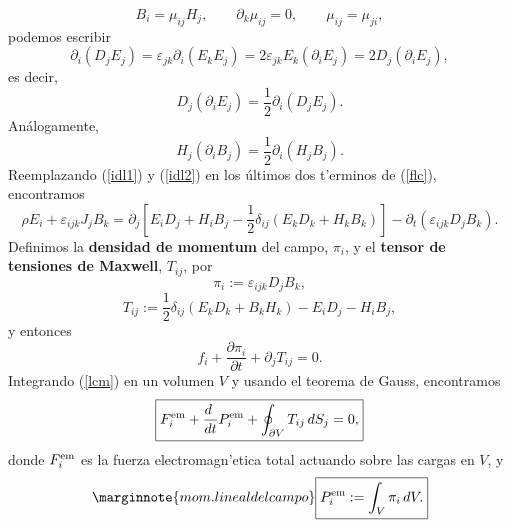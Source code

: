 \begin{equation}
 B_i=\mu_{ij}H_j, \qquad \partial_k\mu_{ij}=0,\qquad \mu_{ij}=\mu_{ji},
\end{equation}
podemos escribir
\begin{equation}
 \partial_i(D_jE_j)=\varepsilon_{jk}\partial_i(E_kE_j)=2\varepsilon_{jk}
E_k(\partial_i E_j)=2D_j(\partial_i E_j),
\end{equation}
es decir,
\begin{equation}
 D_j(\partial_i E_j)=\frac{1}{2}\partial_i(D_jE_j). \label{idl1}
\end{equation}
Análogamente,
\begin{equation}
 H_j(\partial_i B_j)=\frac{1}{2}\partial_i(H_jB_j). \label{idl2}
\end{equation}
Reemplazando (\ref{idl1}) y (\ref{idl2}) en los últimos dos t'erminos de
(\ref{flc}), encontramos
\begin{equation}
 \rho E_i+\varepsilon_{ijk}J_jB_k
=\partial_j\left[E_iD_j+H_iB_j-\frac{1}{2}\delta_{ij}\left(
E_kD_k+H_kB_k\right)\right]-\partial_t(\varepsilon_{ijk}D_jB_k).
\end{equation}
Definimos la \textbf{densidad de momentum} del campo, $\pi_i$, y el \textbf{tensor de tensiones de Maxwell}, $T_{ij}$, por
\begin{equation}
\boxed{\pi_i:=\varepsilon_{ijk}D_jB_k,}
\end{equation}
\begin{equation}
 \boxed{T_{ij}:=\frac{1}{2}\delta_{ij}\left(E_kD_k+B_kH_k\right)-E_iD_j-H_iB_j,}
\end{equation}
y entonces
\begin{equation}
\boxed{f_i+\frac{\partial\pi_i }{\partial t}+\partial_jT_{ij}=0.} \label{lcm}
\end{equation}
Integrando (\ref{lcm}) en un volumen $V$ y usando el teorema de Gauss,
encontramos
\begin{equation}
\boxed{F^{\rm em}_i+\frac{d\ }{dt}P_i^{\rm em}+\oint_{\partial
V}T_{ij}\,dS_j =0,} 
\end{equation}
donde $F^{\rm em}_i$ es la fuerza electromagn'etica total actuando sobre las cargas en $V$, y
\begin{equation}\marginnote{mom. lineal del campo}
 \boxed{P_i^{\rm em}:=\int_V \pi_i\,dV.} \label{defpem}
\end{equation}

